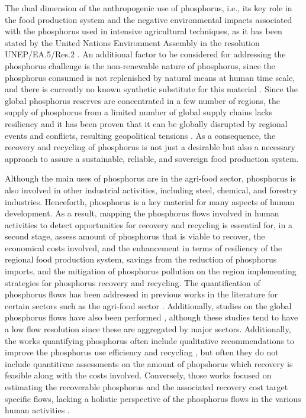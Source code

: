 \documentclass[authoryear]{elsarticle}
\begin{document}
The dual dimension of the anthropogenic use of phosphorus, i.e., its key role in the food production system and the negative environmental impacts associated with the phosphorus used in intensive agricultural techniques, as it has been stated by the United Nations Environment Assembly in the resolution UNEP/EA.5/Res.2 \citep{UN_Phosphorus}. An additional factor to be considered for addressing the phosphorus challenge is the non-renewable nature of phosphorus, since the phosphorus consumed is not replenished by natural means at human time scale, and there is currently no known synthetic substitute for this material \citep{cordell2009story}. Since the global phosphorus reserves are concentrated in a few number of regions, the supply of phosphorus from a limited number of global supply chains lacks resiliency and it has been proven that it can be globally disrupted by regional events and conflicts, resulting geopolitical tensions \citep{FAO_UkraineWar}. As a consequence, the recovery and recycling of phosphorus is not just a desirable but also a necessary approach to assure a sustainable, reliable, and sovereign food production system. 

Although the main uses of phosphorus are in the agri-food sector, phosphorus is also involved in other industrial activities, including steel, chemical, and forestry industries. Henceforth, phosphorus is a key material for many aspects of human development. As a result, mapping the phosphorus flows involved in human activities to detect opportunities for recovery and recycling is essential for, in a second stage, assess amount of phosphorus that is viable to recover, the economical costs involved, and the enhancement in terms of resiliency of the regional food production system, savings from the reduction of phosphorus imports, and the mitigation of phosphorus pollution on the region implementing strategies for phosphorus recovery and recycling. The quantification of phosphorus flows has been addressed in previous works in the literature for certain sectors such as the agri-food sector \citep{boh2020nitrogen, zhou2021model, nesme2018global}. Additionally, studies on the global phosphorus flows have also been performed \citep{villalba2008global, chen2016half}, although these studies tend to have a low flow resolution since these are aggregated by major sectors. Additionally, the works quantifying phosphorus often include qualitative recommendations to improve the phosphorus use efficiency and recycling \citep{van2016phosphorus, senthilkumar2012conceptual}, but often they do not include quantitivae assessments on the amount of phopshorus which recovery is feasible along with the costs involved. Conversely, those works focused on estimating the recoverable phosphorus and the associated recovery cost target specific flows, lacking a holistic perspective of the phosphorus flows in the various human activities \citep{martin2021geospatial, sampat2018technologies}.
\end{document}
